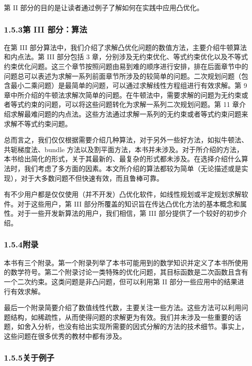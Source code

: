 \documentclass[UTF8, 12pt, fontset=fandol, oneside]{ctexart}
\begin{document}
第 II 部分的目的是让读者通过例子了解如何在实践中应用凸优化。

\subsubsection*{1.5.3\quad 第 III 部分：算法}

在第 III 部分算法中，我们介绍了求解凸优化问题的数值方法，主要介绍牛顿算法和内点法。第 III 部分包括 3 章，分别涉及无约束优化、等式约束优化以及不等式约束优化问题。这三个章节按照问题由易到难的顺序进行安排，排在后面章节中的问题总可以表述为求解一系列前面章节所涉及的较简单的问题。二次规划问题（包含最小二乘问题）是最简单的问题，可以通过求解线性方程组进行有效求解。第 9 章中所介绍的牛顿法求解次简单的问题。在牛顿法中，需要求解的问题为无约束或者等式约束的问题，可以将这些问题转化为求解一系列二次规划问题。第 11 章介绍求解最难问题的内点法。这些方法通过求解一系列的无约束或者等式约束问题来求解不等式约束问题。

总而言之，我们仅仅根据需要介绍几种算法，对于另外一些好方法，如拟牛顿法、共轭梯度法、bundle 方法以及割平面方法，本书并未涉及。对于所介绍的方法，本书给出简化的形式，关于其最新的、最复杂的形式都未涉及。在选择介绍什么算法时，我们考虑了多方面的因素。本文所介绍的算法都较为简单（无论描述或是实现），对于大多数问题不但快速有效，而且鲁棒可靠。

有不少用户都是仅仅使用（并不开发）凸优化软件，如线性规划或半定规划求解软件。对于这些用户，第 III 部分所覆盖的知识旨在传达凸优化方法的基本概念和属性。对于一些开发新算法的用户，我们相信，第 III 部分提供了一个较好的初步介绍。

\subsubsection*{1.5.4\quad 附录}

本书有三个附录。第一个附录列举了本书可能用到的数学知识并定义了本书所使用的数学符号。第二个附录讨论一类特殊的优化问题，其目标函数是二次函数且含有一个二次约束。这类问题是非凸问题，但可以利用第 II 部分一些应用中的结果进行有效求解。

最后一个附录简要介绍了数值线性代数，主要关注一些方法。这些方法可以利用问题结构，如稀疏性，从而使得问题的求解更为有效。我们并未涉及一些重要的话题，如舍入分析，也没有给出实现所需要的因式分解的方法的技术细节。事实上，这些问题在很多优秀的教材中都有涉及。

\subsubsection*{1.5.5\quad 关于例子}
\end{document}
